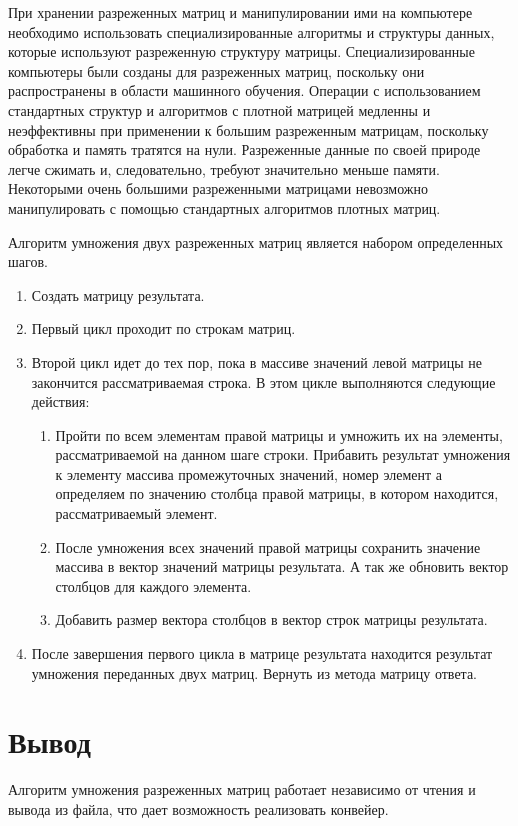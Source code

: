 При хранении разреженных матриц и манипулировании ими на компьютере необходимо использовать специализированные алгоритмы и структуры данных, которые используют разреженную структуру матрицы. Специализированные компьютеры были созданы для разреженных матриц, поскольку они распространены в области машинного обучения. Операции с использованием стандартных структур и алгоритмов с плотной матрицей медленны и неэффективны при применении к большим разреженным матрицам, поскольку обработка и память тратятся на нули. Разреженные данные по своей природе легче сжимать и, следовательно, требуют значительно меньше памяти. Некоторыми очень большими разреженными матрицами невозможно манипулировать с помощью стандартных алгоритмов плотных матриц.

Алгоритм умножения двух разреженных матриц является набором определенных шагов.
\begin{enumerate}
	\setlength{\itemsep}{1.2pt}
	\item Создать матрицу результата.
	\item Первый цикл проходит по строкам матриц.
	\item Второй цикл идет до тех пор, пока в массиве значений левой матрицы не закончится рассматриваемая строка. В этом цикле выполняются следующие действия:
	\begin{enumerate}
		\item Пройти по всем элементам правой матрицы и умножить их на элементы, рассматриваемой на данном шаге строки. Прибавить результат умножения к элементу массива промежуточных значений, номер элемент а определяем по значению столбца правой матрицы, в котором находится, рассматриваемый элемент.
		\item После умножения всех значений правой матрицы сохранить значение массива в вектор значений матрицы результата. А так же обновить вектор столбцов для каждого элемента.
		\item Добавить размер вектора столбцов в вектор строк матрицы результата.
	\end{enumerate}
	\item После завершения первого цикла в матрице результата находится результат умножения переданных двух матриц. Вернуть из метода матрицу ответа.
\end{enumerate}

\section*{Вывод}

Алгоритм умножения разреженных матриц работает независимо от чтения и вывода из файла, что дает возможность реализовать конвейер.